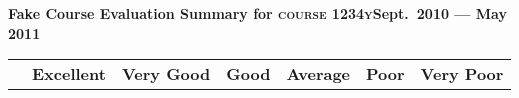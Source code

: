 \documentclass[12pt, oneside, landscape]{memoir}
\newcommand{\cheading}[2]{\textbf{#1\hfill #2}}
\newcommand{\cheading}[2]{\textcolor{Maroon}{\textbf{#1\hfill #2}}}
\begin{document}
\thispagestyle{empty}
\parindent0pt
%

\cheading{Fake Course Evaluation Summary for \textsc{course
    1234y}}{Sept.\ 2010 --- May 2011}

\begin{longtable}{@{}l rr rr rr rr rr rr}

\toprule%
 \centering%
 & \multicolumn{2}{c}{{{\bfseries Excellent}}}
 & \multicolumn{2}{c}{{{\bfseries Very Good}}}
 & \multicolumn{2}{c}{{{\bfseries Good}}}
 & \multicolumn{2}{c}{{{\bfseries Average}}}
 & \multicolumn{2}{c}{{{\bfseries Poor}}}
 & \multicolumn{2}{c}{{{\bfseries Very Poor}}} \    

\cmidrule[0.4pt](r{0.125em}){1-1}%
\cmidrule[0.4pt](lr{0.125em}){2-3}%
\cmidrule[0.4pt](lr{0.125em}){4-5}%
\cmidrule[0.4pt](lr{0.125em}){6-7}%
\cmidrule[0.4pt](lr{0.125em}){8-9}%
\cmidrule[0.4pt](lr{0.125em}){10-11}%
\cmidrule[0.4pt](l{0.25em}){12-13}%
\endhead



\end{longtable}
\end{document}
